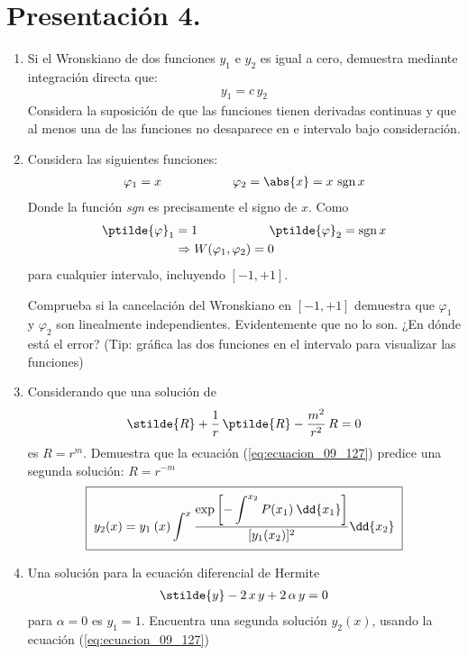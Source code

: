 \section{Presentación 4.}
\begin{enumerate}
\item Si el Wronskiano de dos funciones $y_{1}$ e $y_{2}$ es igual a cero, demuestra mediante integración directa que:
\begin{align*}
y_{1} = c \, y_{2}
\end{align*}
Considera la suposición de que las funciones tienen derivadas continuas y que al menos una de las funciones no desaparece en e intervalo bajo consideración.
\item Considera las siguientes funciones:
\begin{align*}
\varphi_{1} =  x \hspace{2cm} \varphi_{2} = \abs{x} = x \, \, \mbox{sgn} \, x
\end{align*}
Donde la función \textit{sgn} es precisamente el signo de $x$. Como 
\begin{align*}
\ptilde{\varphi}_{1} &=  1 \hspace{2cm} \ptilde{\varphi}_{2} = \mbox{sgn} \, x \\
&\Rightarrow W(\varphi_{1}, \varphi_{2}) = 0
\end{align*}
para cualquier intervalo, incluyendo $[-1, +1]$.
\par
Comprueba si la cancelación del Wronskiano en $[-1, +1]$ demuestra que $\varphi_{1}$ y $\varphi_{2}$ son linealmente independientes. Evidentemente que no lo son. ¿En dónde está el error? (Tip: gráfica las dos funciones en el intervalo para visualizar las funciones)
\item Considerando que una solución de
\begin{align*}
\stilde{R} + \dfrac{1}{r} \, \ptilde{R} - \dfrac{m^{2}}{r^{2}} \, R = 0
\end{align*}
es $R = r^{m}$. Demuestra que la ecuación (\ref{eq:ecuacion_09_127}) predice una segunda solución: $R = r^{-m}$
\begin{align}
\setlength{\fboxsep}{2\fboxsep}\boxed{y_{2}(x) =  y_{1} \: (x) \int^{x} \dfrac{\exp \left[ \displaystyle - \int^{x_{2}} P(x_{1}) \: \dd{x_{1}} \right]}{[y_{1}(x_{2})]^{2}} \dd{x_{2}}}
\label{eq:ecuacion_09_127}
\end{align}
\item Una solución para la ecuación diferencial de Hermite
\begin{align*}
\stilde{y} - 2 \, x \, y + 2 \, \alpha \, y = 0
\end{align*}
para $\alpha = 0$ es $y_{1} = 1$. Encuentra una segunda solución $y_{2}(x)$, usando la ecuación (\ref{eq:ecuacion_09_127})
\end{enumerate}
